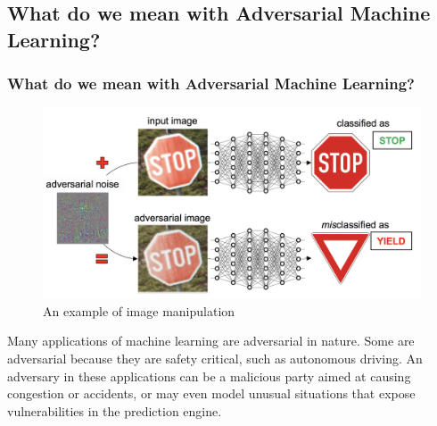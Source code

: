 \documentclass[8pt]{beamer}
\begin{document}
\subsection{What do we mean with Adversarial Machine Learning?}
\begin{frame}
\frametitle{What do we mean with Adversarial Machine Learning?}
\begin{figure} 
    \includegraphics[scale=0.25]{images/adv_stop.png}
    \caption{An example of image manipulation}
\end{figure}
Many applications of machine learning are adversarial in nature. Some are adversarial because they are safety critical, such as autonomous driving. An adversary in these applications can be a malicious party aimed at causing congestion or accidents, or may even model unusual situations that expose vulnerabilities in the prediction engine.
\end{frame}
\end{document}
